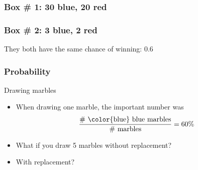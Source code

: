 \documentclass[handout]{beamer}
\begin{document}
   \begin{frame}
   \frametitle{Box \# 1: 30 blue, 20 red}
   \begin{center}
   \end{center}

   \end{frame}



   \begin{frame}
   \frametitle{Box \# 2: 3 blue, 2 red}
   \begin{center}
   \end{center}
   They both have the same chance of winning: 0.6
   \end{frame}


   \begin{frame} \frametitle{Probability}

   \begin{block}
   {Drawing marbles}
   \begin{itemize}
     \item When drawing one marble, the important number was
     $$
     \frac{\# \ \text{{\color{blue} blue marbles}}}{\# \ \text{marbles}} = 60\%
     $$
     \item What if you draw 5 marbles without replacement?
     \item With replacement?
   \end{itemize}
   \end{block}
   \end{frame}

\end{document}
